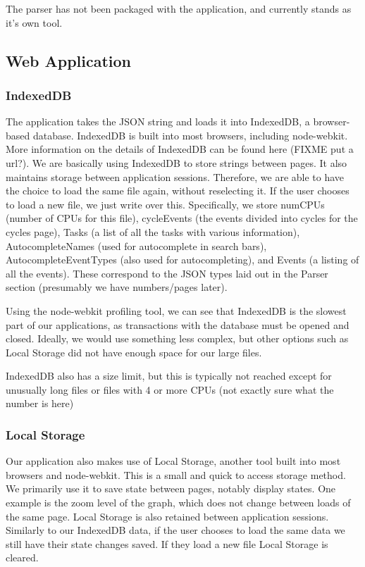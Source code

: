 \documentclass{hmcclinic}
\begin{document}
  The parser has not been packaged with the application, and currently stands as
  it's own tool.

  \subsection{Web Application}

  \subsubsection{IndexedDB}

  The application takes the JSON string and loads it into IndexedDB, a
  browser-based database. IndexedDB is built into most browsers, including
  node-webkit. More information on the details of IndexedDB can be found here
  (FIXME put a url?). We are basically using IndexedDB to store strings between
  pages. It also maintains storage between application sessions. Therefore, we
  are able to have the choice to load the same file again, without reselecting
  it. If the user chooses to load a new file, we just write over this.
  Specifically, we store numCPUs (number of CPUs for this file), cycleEvents
  (the events divided into cycles for the cycles page), Tasks (a list of all the
  tasks with various information), AutocompleteNames (used for autocomplete in
  search bars), AutocompleteEventTypes (also used for autocompleting), and
  Events (a listing of all the events). These correspond to the JSON types laid
  out in the Parser section (presumably we have numbers/pages later).

  Using the node-webkit profiling tool, we can see that IndexedDB is the slowest
  part of our applications, as transactions with the database must be opened and
  closed. Ideally, we would use something less complex, but other options such
  as Local Storage did not have enough space for our large files.

  IndexedDB also has  a size limit, but this is typically not reached except for
  unusually long files or files with 4 or more CPUs (not exactly sure what the
  number is here)

  \subsubsection{Local Storage}

  Our application also makes use of Local Storage, another tool
  built into most browsers and node-webkit. This is a small and quick to access
  storage method. We primarily use it to save state between pages, notably
  display states. One example is the zoom level of the graph, which does not
  change between loads of the same page. Local Storage is also retained between
  application sessions. Similarly to our IndexedDB data, if the user chooses to
  load the same data we still have their state changes saved. If they load a new
  file Local Storage is cleared.
\end{document}
